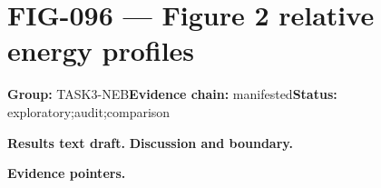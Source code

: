 \clearpage
\section{FIG-096 --- Figure 2 relative energy profiles}
\label{figpage:fig-096}
\textbf{Group:} TASK3-NEB\quad \textbf{Evidence chain:} manifested\quad \textbf{Status:} exploratory;audit;comparison

\textbf{Results text draft.} 
\textbf{Discussion and boundary.} 


\textbf{Evidence pointers.}



\vfill
